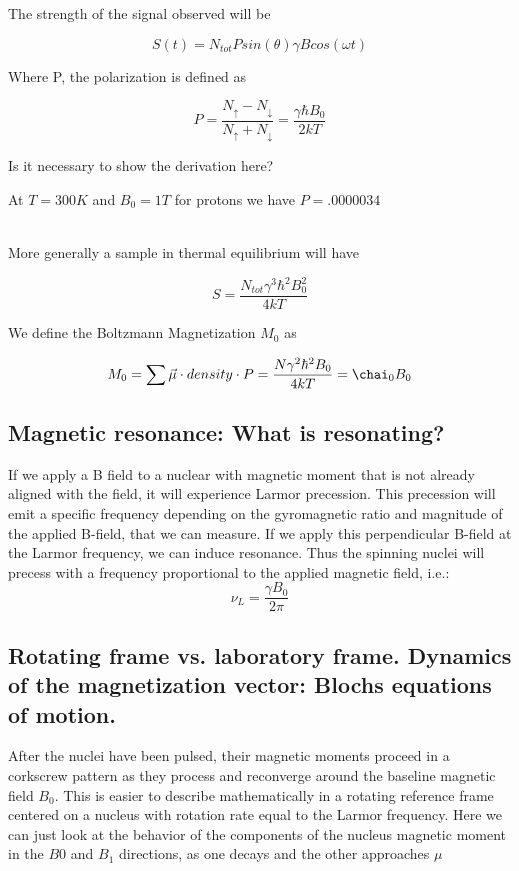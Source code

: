 \documentclass[12pt]{article}
\begin{document}
The strength of the signal observed will be

\[S(t) = N_{tot}Psin(\theta)\gamma B cos(\omega t)\]

Where P, the polarization is defined as

\[P = \frac{N_{\uparrow} - N_{\downarrow}}{N_{\uparrow} + N_{\downarrow}} = \frac{\gamma \hbar B_0}{2kT}\]

Is it necessary to show the derivation here?

At $T= 300K$ and $B_0 = 1T$ for protons we have $P = .0000034$ \cite{pirl_youtube_mri}
\\\

More generally a sample in thermal equilibrium will have

\[S = \frac{N_{tot}\gamma^3\hbar^2B_0^2}{4kT}\]


We define the Boltzmann Magnetization $M_0$ as

\[M_0 = \sum \vec{\mu} \cdot density \cdot P = \frac{N\gamma^2\hbar^2B_0}{4kT} = \chai_0 B_0\]

\subsection { Magnetic resonance: What is resonating?}

If we apply a B field to a nuclear with magnetic moment that is not already aligned with the field, it will experience Larmor precession. This precession will emit a specific frequency depending on the gyromagnetic ratio and magnitude of the applied B-field, that we can measure. If we apply this perpendicular B-field at the Larmor frequency, we can induce resonance.
Thus the spinning nuclei will precess with a frequency proportional to the applied magnetic field, i.e.:
\[\nu_L = \frac{\gamma B_0}{2\pi}\]

\subsection {Rotating frame vs. laboratory frame. Dynamics of the magnetization vector: Blochs equations of motion.}

After the nuclei have been pulsed, their magnetic moments proceed in a corkscrew pattern as they process and reconverge around the baseline magnetic field $B_0$. This is easier to describe mathematically in a rotating reference frame centered on a nucleus with rotation rate equal to the Larmor frequency. Here we can just look at the behavior of the components of the nucleus magnetic moment in the $B0$ and $B_1$ directions, as one decays and the other approaches $\mu$
\end{document}
